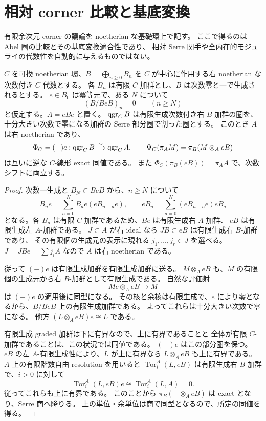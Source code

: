 \section{相対 corner 比較と基底変換}
\label{sec:relative-corners}

有限余次元 corner の議論を noetherian な基礎環上で記す。
ここで得るのは Abel 圏の比較とその基底変換適合性であり、
相対 Serre 関手や全内在的モジュライの代数性を自動的に与えるものではない。

\begin{proposition}
\label{prop:relative-cofinite-corner}
$C$ を可換 noetherian 環、$B=\bigoplus_{n\ge0}B_n$ を
$C$ が中心に作用する右 noetherian な次数付き $C$-代数とする。
各 $B_n$ は有限 $C$-加群とし、$B$ は次数零と一で生成されるとする。
$e\in B_0$ は冪等元で、ある $N$ について
\[
 (B/BeB)_n=0\qquad(n\ge N)
\]
と仮定する。$A=eBe$ と置く。
$\operatorname{qgr}_C B$ は有限生成次数付き右 $B$-加群の圏を、
十分大きい次数で零になる加群の Serre 部分圏で割った圏とする。
このとき $A$ は右 noetherian であり、
\[
 \Phi_C=(-)e:\operatorname{qgr}_C B\xrightarrow{\sim}\operatorname{qgr}_C A,
 \qquad
 \Psi_C(\pi_A M)=\pi_B(M\otimes_A eB)
\]
は互いに逆な $C$-線形 exact 同値である。
また $\Phi_C(\pi_B(eB))=\pi_AA$ で、次数シフトに両立する。
\end{proposition}
\begin{proof}
次数一生成と $B_N\subset BeB$ から、$n\ge N$ について
\[
 B_ne=\sum_{a=0}^N B_ae(eB_{n-a}e),\qquad
 eB_n=\sum_{a=0}^N(eB_{n-a}e)eB_a
\]
となる。各 $B_a$ は有限 $C$-加群であるため、$Be$ は有限生成右 $A$-加群、
$eB$ は有限生成左 $A$-加群である。
$J\subset A$ が右 ideal なら $JB\subset eB$ は有限生成右 $B$-加群であり、
その有限個の生成元の表示に現れる $j_1,\ldots,j_r\in J$ を選べる。
$J=JBe=\sum j_iA$ なので $A$ は右 noetherian である。

従って $(-)e$ は有限生成加群を有限生成加群に送る。
$M\otimes_AeB$ も、$M$ の有限個の生成元から右 $B$-加群として有限生成である。
自然な評価射
\[
 Me\otimes_AeB\longrightarrow M
\]
は $(-)e$ の適用後に同型になる。
その核と余核は有限生成で、$e$ により零となるから、$B/BeB$ 上の有限生成加群である。
よってこれらは十分大きい次数で零になる。
他方 $(L\otimes_AeB)e\cong L$ である。

有限生成 graded 加群は下に有界なので、上に有界であることと
全体が有限 $C$-加群であることは、この状況では同値である。
$(-)e$ はこの部分圏を保つ。
$eB$ の左 $A$-有限生成性により、$L$ が上に有界なら
$L\otimes_AeB$ も上に有界である。
$A$ 上の有限階数自由 resolution を用いると
$\operatorname{Tor}^A_i(L,eB)$ は有限生成右 $B$-加群で、$i>0$ に対して
\[
 \operatorname{Tor}^A_i(L,eB)e
   \cong\operatorname{Tor}^A_i(L,A)=0.
\]
従ってこれらも上に有界である。
このことから $\pi_B(-\otimes_AeB)$ は exact となり、Serre 商へ降りる。
上の単位・余単位は商で同型となるので、所定の同値を得る。
\end{proof}


